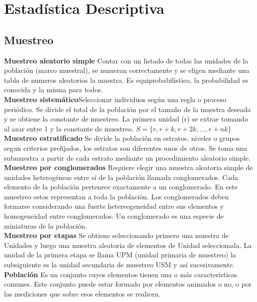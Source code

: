 \documentclass[10pt,a4paper]{article}
\begin{document}
	\section{Estadística Descriptiva}
	\subsection{Muestreo}
	\textbf{Muestreo aleatorio simple} Contar con un listado de todas las unidades de la población (marco muestral), se numeran correctamente y se eligen mediante una tabla de numeros aleatorios la muestra. Es equiprobabilistico, la probabilidad es conocida y la misma para todos.\\
	
	\textbf{Muestreo sistemático}Seleccionar individuos según una regla o proceso periódico. Se divide el total de la población por el tamaño de la muestra deseada y se obtiene la constante de muestreo. La primera unidad (r) se extrae tomando al azar entre 1 y la constante de muestreo. $S=\{r,r+k,r+2k,\dots, r+nk\}$\\
	
	\textbf{Muestreo estratificado} Se divide la población en estratos, niveles o grupos segun criterios prefijados, los estratos son diferentes unos de otros. Se toma una submuestra a partir de cada estrato mediante un procedimiento aleatorio simple.\\
	
	\textbf{Muestreo por conglomerados} Requiere elegir una muestra aleatoria simple de unidades heterogéneas entre sí de la población llamada conglomerados. Cada elemento de la población pertenece exactamente a un conglomerado. En este muestreo estos representan a toda la población. Los conglomerados deben formarse considerando una fuerte hetereogeneidad entre sus elementos y homogeneidad entre conglomerados. Un conglomerado es una especie de miniaturas de la población.\\
	
	\textbf{Muestreo por etapas} Se obtiene seleccionando primero una muestra de Unidades y luego una muestra aleatoria de elementos de Unidad seleccionada. La unidad de la primera etapa se llama UPM (unidad primaria de muestreo) la subsiguiente es la unidad secundaria de muestreo USM y así sucesivamente.\\
	
	\textbf{Población} Es un conjunto cuyos elementos tienen una o más caracteristicas comunes. Este conjunto puede estar formado por elementos animados o no, o por las mediciones que sobre esos elementos se realicen.\\
	
\end{document}
